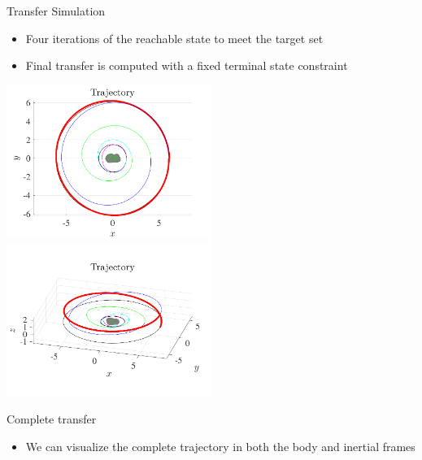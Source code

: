 \begin{frame}{Transfer Simulation}
    \begin{itemize}
        \item Four iterations of the reachable state to meet the target set
        \item Final transfer is computed with a fixed terminal state constraint
    \end{itemize}

    \begin{center}
        \includegraphics[width=0.5\textwidth,height=0.7\textheight,keepaspectratio]{figures/2016AAS/trajectory.pdf}~
        \includegraphics[width=0.5\textwidth,height=0.7\textheight,keepaspectratio]{figures/2016AAS/trajectory_3d.pdf}
    \end{center}

\end{frame}

\begin{frame}{Complete transfer}
\begin{itemize}
    \item We can visualize the complete trajectory in both the body and inertial frames
\end{itemize}

\begin{center}
  ~\hfill
\end{center}

\end{frame}

